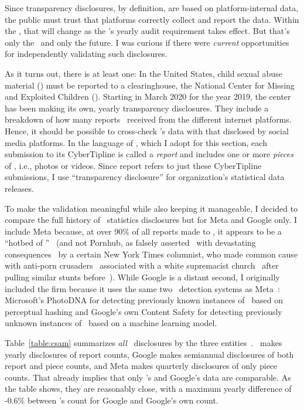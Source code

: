 
Since transparency disclosures, by definition, are based on platform-internal
data, the public must trust that platforms correctly collect and report the
data. Within the \EU, that will change as the \DSA's yearly audit requirement
takes effect. But that's only the \EU\ and only the future. I was curious if
there were \emph{current} opportunities for independently validating such
disclosures.

As it turns out, there is at least one: In the United States, child sexual abuse
material (\CSAM) must be reported to a clearinghouse, the National Center for
Missing and Exploited Children (\NCMEC). Starting in March 2020 for the year
2019, the center has been making its own, yearly transparency disclosures. They
include a breakdown of how many reports \NCMEC\ received from the different
internet platforms. Hence, it should be possible to cross-check \NCMEC's data
with that disclosed by social media platforms. In the language of \NCMEC, which
I adopt for this section, each submission to its CyberTipline is called a
\emph{report} and includes one or more \emph{pieces} of \CSAM, i.e., photos or
videos. Since report refers to just these CyberTipline submissions, I use
``transparency disclosure'' for organization's statistical data releases.

To make the validation meaningful while also keeping it manageable, I decided to
compare the full history of \CSAM\ statistics disclosures but for Meta and
Google only. I include Meta because, at over 90\% of all reports made to \NCMEC,
it appears to be a ``hotbed of \CSAM''~\cite{Hitt2021} (and not Pornhub, as
falsely asserted~\cite{Brown2020,Grant2020} with devastating
consequences~\cite{Celarier2021,Dickson2020,Harris2021,Stoya2021,TheIndependent2021b}
by a certain New York Times columnist, who made common cause with anti-porn
crusaders~\cite{Hitt2020a} associated with a white supremacist
church~\cite{Halley2021,ProducerX2020} after pulling similar stunts
before~\cite{Bass2014,Brown2019,Dickson2014,Martin2012,Masnick2017,McCormack2012,Talusan2017}).
While Google is a distant second, I originally included the firm because it uses
the same two \CSAM\ detection systems as Meta~\cite{Allen2011,Davis2018}:
Microsoft's PhotoDNA for detecting previously known instances of \CSAM\ based on
perceptual hashing and Google's own Content Safety \API{} for detecting
previously unknown instances of \CSAM\ based on a machine learning model.

Table~\ref{table:csam} summarizes \emph{all} \CSAM\ disclosures by the three
entities~\cite{NcmecByPlatform2019,NcmecByPlatform2020,NcmecByPlatform2021}.
\NCMEC\ makes yearly disclosures of report counts, Google makes semiannual
disclosures of both report and piece counts, and Meta makes quarterly
disclosures of only piece counts. That already implies that only \NCMEC's and
Google's data are comparable. As the table shows, they are reasonably close,
with a maximum yearly difference of -0.6\% between \NCMEC's count for Google and
Google's own count.


